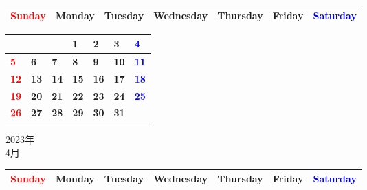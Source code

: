 \documentclass[a4paper,landscape]{jsarticle}
\newcommand{\dig}{\hspace{29mm}}
\newcommand{\tdig}{\hspace{27mm}}
\newcommand{\LBF}{\LARGE\textbf}
\begin{document}
\begingroup
\renewcommand{\arraystretch}{1.4}
\begin{tabular}{|>{\centering\arraybackslash}p{32mm}|>{\centering\arraybackslash}p{32mm}|>{\centering\arraybackslash}p{32mm}|>{\centering\arraybackslash}p{32mm}|>{\centering\arraybackslash}p{32mm}|>{\centering\arraybackslash}p{32mm}|>{\centering\arraybackslash}p{32mm}|}
\hline
\textcolor{red}{\large Sunday}&\large Monday&\large Tuesday&\large Wednesday&\large Thursday&\large Friday&\textcolor{blue}{\large Saturday}\\
\hline
\end{tabular}
\endgroup

\begingroup
\renewcommand{\arraystretch}{4}
\begin{tabular}{|p{32mm}|p{32mm}|p{32mm}|p{32mm}|p{32mm}|p{32mm}|p{32mm}|}
\hline
&&&\raisebox{30pt} {\dig\LBF{1}}&\raisebox{30pt} {\dig\LBF{2}}&\raisebox{30pt} {\dig\LBF{3}}&\raisebox{30pt} {\dig\textcolor{blue}{\LBF{4}}}\\
\hline
\raisebox{30pt} {\dig\textcolor{red}{\LBF{5}}}&\raisebox{30pt} {\dig\LBF{6}}&\raisebox{30pt} {\dig\LBF{7}}&\raisebox{30pt} {\dig\LBF{8}}&\raisebox{30pt} {\dig\LBF{9}}&\raisebox{30pt} {\tdig\LBF{10}}&\raisebox{30pt} {\tdig\textcolor{blue}{\LBF{11}}}\\
\hline
\raisebox{30pt} {\tdig\textcolor{red}{\LBF{12}}}&\raisebox{30pt} {\tdig\LBF{13}}&\raisebox{30pt} {\tdig\LBF{14}}&\raisebox{30pt} {\tdig\LBF{15}}&\raisebox{30pt} {\tdig\LBF{16}}&\raisebox{30pt} {\tdig\LBF{17}}&\raisebox{30pt} {\tdig\textcolor{blue}{\LBF{18}}}\\
\hline
\raisebox{30pt} {\tdig\textcolor{red}{\LBF{19}}}&\raisebox{30pt} {\tdig\LBF{20}}&\raisebox{30pt} {\tdig\LBF{21}}&\raisebox{30pt} {\tdig\LBF{22}}&\raisebox{30pt} {\tdig\LBF{23}}&\raisebox{30pt} {\tdig\LBF{24}}&\raisebox{30pt} {\tdig\textcolor{blue}{\LBF{25}}}\\
\hline
\raisebox{30pt} {\tdig\textcolor{red}{\LBF{26}}}&\raisebox{30pt} {\tdig\LBF{27}}&\raisebox{30pt} {\tdig\LBF{28}}&\raisebox{30pt} {\tdig\LBF{29}}&\raisebox{30pt} {\tdig\LBF{30}}&\raisebox{30pt} {\tdig\LBF{31}}&\\
\hline
\end{tabular}
\endgroup

\newpage

\begin{center}
	\LARGE 2023年\\
	\LARGE 4月
\end{center}

\begingroup
\renewcommand{\arraystretch}{1.4}
\begin{tabular}{|>{\centering\arraybackslash}p{32mm}|>{\centering\arraybackslash}p{32mm}|>{\centering\arraybackslash}p{32mm}|>{\centering\arraybackslash}p{32mm}|>{\centering\arraybackslash}p{32mm}|>{\centering\arraybackslash}p{32mm}|>{\centering\arraybackslash}p{32mm}|}
\hline
\textcolor{red}{\large Sunday}&\large Monday&\large Tuesday&\large Wednesday&\large Thursday&\large Friday&\textcolor{blue}{\large Saturday}\\
\hline
\end{tabular}
\endgroup
\end{document}
